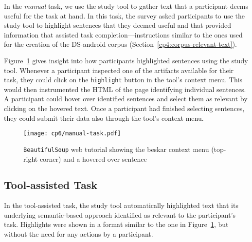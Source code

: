 In the \textit{manual} task, we use the study tool to gather text that a participant deems useful for the task at hand. In this task, 
the survey asked participants to use the study tool to highlight sentences that they deemed useful and that provided information that assisted task completion---instructions similar to the ones used for the creation of the \acs{DS-android} corpus (Section~\ref{cp4:corpus-relevant-text}).



Figure~\ref{fig:artifact-pre-highlight}
gives insight into how participants highlighted sentences using the study tool. 
Whenever a participant inspected one of the artifacts available for their task, 
they could click on the \texttt{highlight} button in the tool's context menu.  
This would then instrumented the HTML of the page identifying individual sentences. 
A participant could hover over identified sentences and select them as relevant by clicking on the hovered text.
Once a participant had finished selecting sentences, they could submit 
their data also through the tool's context menu.





\begin{figure}
    \centering
    \texttt{[image: cp6/manual-task.pdf]}
    \caption{\texttt{BeautifulSoup} web tutorial showing the \acs{beskar} context menu (top-right corner) and a hovered over sentence}
    \label{fig:artifact-pre-highlight}
\end{figure}




\subsection{Tool-assisted Task}
\label{cp6:procedures-tool-assisted}


In the tool-assisted task, the study tool automatically highlighted text that 
its underlying semantic-based approach identified as relevant to the participant's task.
Highlights were shown in a format similar to the one in Figure~\ref{fig:artifact-pre-highlight}, but without the need for any actions by a participant.





